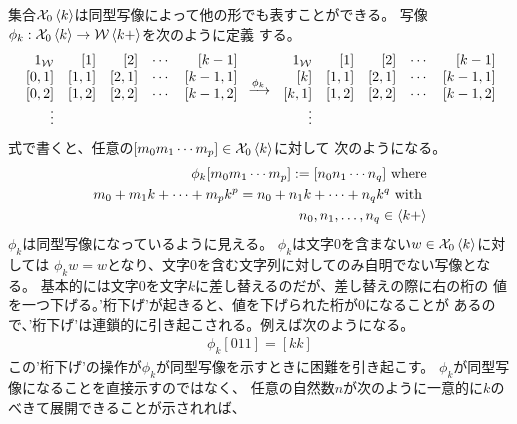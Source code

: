 	集合${{\mathcal{X}}}_0\mathinner{\langle{k}\rangle}$は同型写像によって他の形でも表すことができる。
	写像$\phi_k:{{\mathcal{X}}}_0\mathinner{\langle{k}\rangle}\to{\ensuremath{{\mathcal{W}}}}\mathinner{\langle{k+}\rangle}$を次のように定義
	する。
	\begin{equation*}\begin{split}
		\begin{array}{rrrcr}
			\,1_{{\mathcal{W}}} & [1] & [2] & \cdots & [k-1] \\
			\,[0,1] & [1,1] & [2,1] & \cdots & [k-1,1] \\
			\,[0,2] & [1,2] & [2,2] & \cdots & [k-1,2] \\
			\vdots \\
		\end{array} \xrightarrow[{}]{\phi_k} \begin{array}{rrrcr}
			\,1_{{\mathcal{W}}} & [1] & [2] & \cdots & [k-1] \\
			\,[k] & [1,1] & [2,1] & \cdots & [k-1,1] \\
			\,[k,1] & [1,2] & [2,2] & \cdots & [k-1,2] \\
			\vdots \\
		\end{array}
	\end{split}\end{equation*}
	式で書くと、任意の$[m_0m_1\cdots m_p]\in{\ensuremath{{\mathcal{X}}}}_0\mathinner{\langle{k}\rangle}$に対して
	次のようになる。
	\begin{equation*}\begin{split}
		\phi_k[m_0m_1\cdots m_p] := [n_0n_1\cdots n_q] \text{ where} \\
		m_0 + m_1k + \cdots + m_pk^p = n_0 + n_1k + \cdots + n_qk^q \text{ with } \\
		n_0,n_1,\dots,n_q\in\mathinner{\langle{k+}\rangle}
	\end{split}\end{equation*}
	$\phi_k$は同型写像になっているように見える。
	$\phi_k$は文字$0$を含まない$w\in{\ensuremath{{\mathcal{X}}}}_0\mathinner{\langle{k}\rangle}$に対しては
	$\phi_kw=w$となり、文字$0$を含む文字列に対してのみ自明でない写像となる。
	基本的には文字$0$を文字$k$に差し替えるのだが、差し替えの際に右の桁の
	値を一つ下げる。'桁下げ'が起きると、値を下げられた桁が$0$になることが
	あるので、'桁下げ'は連鎖的に引き起こされる。例えば次のようになる。
	\begin{equation*}\begin{split}
		\phi_k[011] = [kk]
	\end{split}\end{equation*}
	この'桁下げ'の操作が$\phi_k$が同型写像を示すときに困難を引き起こす。
	$\phi_k$が同型写像になることを直接示すのではなく、
	任意の自然数$n$が次のように一意的に$k$のべきて展開できることが示されれば、
